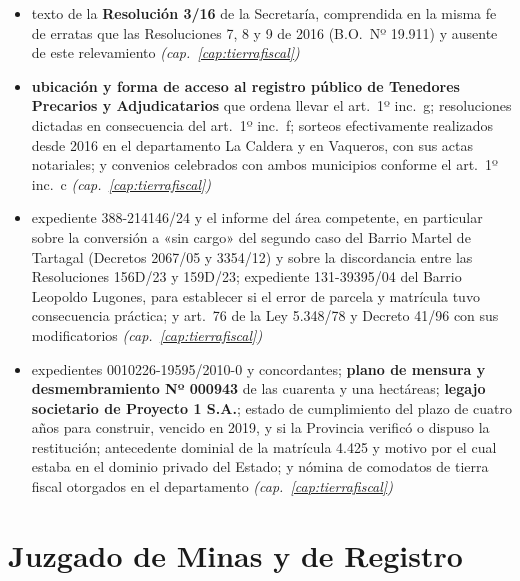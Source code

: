 \begin{itemize}[leftmargin=*]
\item texto de la \textbf{Resolución 3/16} de la Secretaría, comprendida en la misma fe de erratas que las Resoluciones 7, 8 y 9 de 2016 (B.O.\ Nº 19.911) y ausente de este relevamiento \textit{(cap.\ \ref{cap:tierrafiscal})}
\item \textbf{ubicación y forma de acceso al registro público de Tenedores Precarios y Adjudicatarios} que ordena llevar el art.\ 1º inc.\ g; resoluciones dictadas en consecuencia del art.\ 1º inc.\ f; sorteos efectivamente realizados desde 2016 en el departamento La Caldera y en Vaqueros, con sus actas notariales; y convenios celebrados con ambos municipios conforme el art.\ 1º inc.\ c \textit{(cap.\ \ref{cap:tierrafiscal})}
\item expediente 388-214146/24 y el informe del área competente, en particular sobre la conversión a «sin cargo» del segundo caso del Barrio Martel de Tartagal (Decretos 2067/05 y 3354/12) y sobre la discordancia entre las Resoluciones 156D/23 y 159D/23; expediente 131-39395/04 del Barrio Leopoldo Lugones, para establecer si el error de parcela y matrícula tuvo consecuencia práctica; y art.\ 76 de la Ley 5.348/78 y Decreto 41/96 con sus modificatorios \textit{(cap.\ \ref{cap:tierrafiscal})}
\item expedientes 0010226-19595/2010-0 y concordantes; \textbf{plano de mensura y desmembramiento Nº 000943} de las cuarenta y una hectáreas; \textbf{legajo societario de Proyecto 1 S.A.}; estado de cumplimiento del plazo de cuatro años para construir, vencido en 2019, y si la Provincia verificó o dispuso la restitución; antecedente dominial de la matrícula 4.425 y motivo por el cual estaba en el dominio privado del Estado; y nómina de comodatos de tierra fiscal otorgados en el departamento \textit{(cap.\ \ref{cap:tierrafiscal})}
\end{itemize}

\section{Juzgado de Minas y de Registro}

